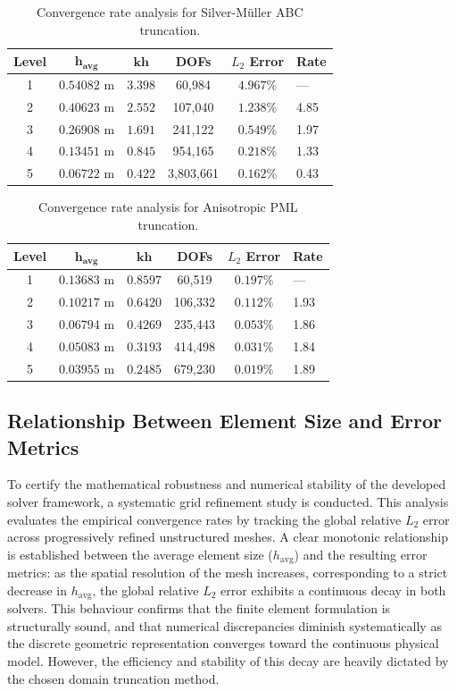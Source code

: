 \documentclass[class=report, crop=false]{standalone}
\begin{document}
\begin{table}[H]
\centering
\caption{Convergence rate analysis for Silver-M\"{u}ller ABC truncation.}
\label{tab:convergence_abc}
\begin{tabular}{cccccl}
\toprule
\textbf{Level} & $\bm{h_{\text{avg}}}$ & $\bm{kh}$ & \textbf{DOFs} & \textbf{$L_2$ Error} & \textbf{Rate} \\
\midrule
1 & $0.54082$ m & $3.398$ & 60,984    & $4.967\%$ & --- \\
2 & $0.40623$ m & $2.552$ & 107,040   & $1.238\%$ & 4.85 \\
3 & $0.26908$ m & $1.691$ & 241,122   & $0.549\%$ & 1.97 \\
4 & $0.13451$ m & $0.845$ & 954,165   & $0.218\%$ & 1.33 \\
5 & $0.06722$ m & $0.422$ & 3,803,661 & $0.162\%$ & 0.43 \\
\bottomrule
\end{tabular}
\end{table}

\begin{table}[H]
\centering
\caption{Convergence rate analysis for Anisotropic PML truncation.}
\label{tab:convergence_pml}
\begin{tabular}{cccccl}
\toprule
\textbf{Level} & $\bm{h_{\text{avg}}}$ & $\bm{kh}$ & \textbf{DOFs} & \textbf{$L_2$ Error} & \textbf{Rate} \\
\midrule
1 & $0.13683$ m & $0.8597$ & 60,519  & $0.197\%$ & --- \\
2 & $0.10217$ m & $0.6420$ & 106,332 & $0.112\%$ & 1.93 \\
3 & $0.06794$ m & $0.4269$ & 235,443 & $0.053\%$ & 1.86 \\
4 & $0.05083$ m & $0.3193$ & 414,498 & $0.031\%$ & 1.84 \\
5 & $0.03955$ m & $0.2485$ & 679,230 & $0.019\%$ & 1.89 \\
\bottomrule
\end{tabular}
\end{table}

\subsection{Relationship Between Element Size and Error Metrics}

To certify the mathematical robustness and numerical stability of the developed solver framework, a systematic grid refinement study is conducted. This analysis evaluates the empirical convergence rates by tracking the global relative $L_2$ error across progressively refined unstructured meshes. A clear monotonic relationship is established between the average element size ($h_{\text{avg}}$) and the resulting error metrics: as the spatial resolution of the mesh increases, corresponding to a strict decrease in $h_{\text{avg}}$, the global relative $L_2$ error exhibits a continuous decay in both solvers. This behaviour confirms that the finite element formulation is structurally sound, and that numerical discrepancies diminish systematically as the discrete geometric representation converges toward the continuous physical model. However, the efficiency and stability of this decay are heavily dictated by the chosen domain truncation method.
\end{document}
